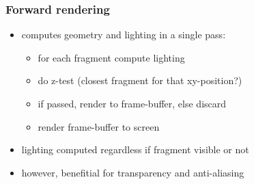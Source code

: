 \documentclass[aspectratio=169]{beamer}
\begin{document}
	\begin{frame}
		\frametitle{Forward rendering}
		\begin{itemize}
			\item computes geometry and lighting in a single pass:
				\begin{itemize}
					\item for each fragment compute lighting
					\item do z-test (closest fragment for that xy-position?)
					\item if passed, render to frame-buffer, else discard
					\item render frame-buffer to screen
				\end{itemize}
			\item lighting computed regardless if fragment visible or not
			\item however, benefitial for transparency and anti-aliasing
		\end{itemize}
	\end{frame}
\end{document}

